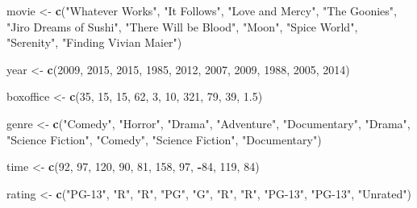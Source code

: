 \documentclass[]{book}
\newenvironment{Shaded}{\begin{snugshade}}{\end{snugshade}}
\newcommand{\KeywordTok}[1]{\textcolor[rgb]{0.13,0.29,0.53}{\textbf{#1}}}
\newcommand{\DecValTok}[1]{\textcolor[rgb]{0.00,0.00,0.81}{#1}}
\newcommand{\FloatTok}[1]{\textcolor[rgb]{0.00,0.00,0.81}{#1}}
\newcommand{\StringTok}[1]{\textcolor[rgb]{0.31,0.60,0.02}{#1}}
\newcommand{\OperatorTok}[1]{\textcolor[rgb]{0.81,0.36,0.00}{\textbf{#1}}}
\newcommand{\NormalTok}[1]{#1}
\theoremstyle{definition}
\theoremstyle{definition}
\theoremstyle{remark}
\begin{document}
\begin{Shaded}
\begin{Highlighting}[]
\NormalTok{movie <-}\StringTok{ }\KeywordTok{c}\NormalTok{(}\StringTok{"Whatever Works"}\NormalTok{, }\StringTok{"It Follows"}\NormalTok{, }\StringTok{"Love and Mercy"}\NormalTok{, }
             \StringTok{"The Goonies"}\NormalTok{, }\StringTok{"Jiro Dreams of Sushi"}\NormalTok{,}
             \StringTok{"There Will be Blood"}\NormalTok{, }\StringTok{"Moon"}\NormalTok{, }
             \StringTok{"Spice World"}\NormalTok{, }\StringTok{"Serenity"}\NormalTok{, }\StringTok{"Finding Vivian Maier"}\NormalTok{)}

\NormalTok{year <-}\StringTok{ }\KeywordTok{c}\NormalTok{(}\DecValTok{2009}\NormalTok{, }\DecValTok{2015}\NormalTok{, }\DecValTok{2015}\NormalTok{, }\DecValTok{1985}\NormalTok{, }\DecValTok{2012}\NormalTok{, }\DecValTok{2007}\NormalTok{, }\DecValTok{2009}\NormalTok{, }\DecValTok{1988}\NormalTok{, }\DecValTok{2005}\NormalTok{, }\DecValTok{2014}\NormalTok{)}

\NormalTok{boxoffice <-}\StringTok{ }\KeywordTok{c}\NormalTok{(}\DecValTok{35}\NormalTok{, }\DecValTok{15}\NormalTok{, }\DecValTok{15}\NormalTok{, }\DecValTok{62}\NormalTok{, }\DecValTok{3}\NormalTok{, }\DecValTok{10}\NormalTok{, }\DecValTok{321}\NormalTok{, }\DecValTok{79}\NormalTok{, }\DecValTok{39}\NormalTok{, }\FloatTok{1.5}\NormalTok{)}

\NormalTok{genre <-}\StringTok{ }\KeywordTok{c}\NormalTok{(}\StringTok{"Comedy"}\NormalTok{, }\StringTok{"Horror"}\NormalTok{, }\StringTok{"Drama"}\NormalTok{, }\StringTok{"Adventure"}\NormalTok{, }\StringTok{"Documentary"}\NormalTok{, }
           \StringTok{"Drama"}\NormalTok{, }\StringTok{"Science Fiction"}\NormalTok{, }\StringTok{"Comedy"}\NormalTok{, }\StringTok{"Science Fiction"}\NormalTok{, }
           \StringTok{"Documentary"}\NormalTok{)}

\NormalTok{time <-}\StringTok{ }\KeywordTok{c}\NormalTok{(}\DecValTok{92}\NormalTok{, }\DecValTok{97}\NormalTok{, }\DecValTok{120}\NormalTok{, }\DecValTok{90}\NormalTok{, }\DecValTok{81}\NormalTok{, }\DecValTok{158}\NormalTok{, }\DecValTok{97}\NormalTok{, }\OperatorTok{-}\DecValTok{84}\NormalTok{, }\DecValTok{119}\NormalTok{, }\DecValTok{84}\NormalTok{)}

\NormalTok{rating <-}\StringTok{ }\KeywordTok{c}\NormalTok{(}\StringTok{"PG-13"}\NormalTok{, }\StringTok{"R"}\NormalTok{, }\StringTok{"R"}\NormalTok{, }\StringTok{"PG"}\NormalTok{, }\StringTok{"G"}\NormalTok{, }\StringTok{"R"}\NormalTok{, }\StringTok{"R"}\NormalTok{, }
            \StringTok{"PG-13"}\NormalTok{, }\StringTok{"PG-13"}\NormalTok{, }\StringTok{"Unrated"}\NormalTok{)}
\end{Highlighting}
\end{Shaded}
\end{document}
